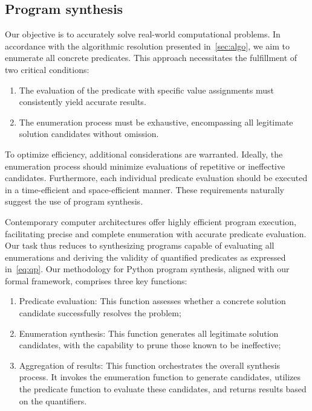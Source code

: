 \subsection{Program synthesis}\label{sec:prog}
Our objective is to accurately solve real-world computational problems. In accordance with the algorithmic resolution presented in~\cref{sec:algo}, we aim to enumerate all concrete predicates. This approach necessitates the fulfillment of two critical conditions:
\begin{enumerate}
[parsep=0pt,itemsep=1pt,leftmargin=13pt]
\vspace{-0.2cm}
    \item The evaluation of the predicate with specific value assignments must consistently yield accurate results.
    \item The enumeration process must be exhaustive, encompassing all legitimate solution candidates without omission.
\end{enumerate}
To optimize efficiency, additional considerations are warranted. Ideally, the enumeration process should minimize evaluations of repetitive or ineffective candidates. Furthermore, each individual predicate evaluation should be executed in a time-efficient and space-efficient manner.
These requirements naturally suggest
the use of program synthesis.

Contemporary computer architectures offer highly efficient program execution, facilitating precise and complete enumeration with accurate predicate evaluation. Our task thus reduces to synthesizing programs capable of evaluating all enumerations and deriving the validity of quantified predicates as expressed in~\cref{eq:qp}. %
%
Our methodology for Python program synthesis, aligned with our formal framework, comprises three key functions:
\begin{enumerate}
[parsep=0pt,itemsep=1pt,leftmargin=13pt]
\vspace{-0.2cm}
    \item Predicate evaluation: This function assesses whether a concrete solution candidate successfully resolves the problem;
    \item Enumeration synthesis: This function generates all legitimate solution candidates, with the capability to prune those known to be ineffective;
    \item Aggregation of results: This function orchestrates the overall synthesis process. It invokes the enumeration function to generate candidates, utilizes the predicate function to evaluate these candidates, and returns results based on the quantifiers.
\end{enumerate}


